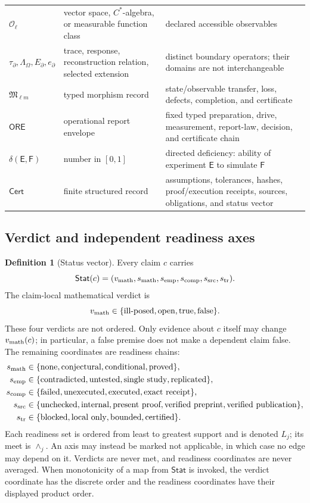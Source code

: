 \documentclass[11pt,a4paper]{article}
\theoremstyle{definition}
\newtheorem{definition}{Definition}[section]
\theoremstyle{plain}
\theoremstyle{remark}
\newcommand{\Obs}{\mathcal O}
\newcommand{\Cert}{\mathsf{Cert}}
\newcommand{\Stat}{\mathsf{Stat}}
\begin{document}
\begin{longtable}{L{0.18\textwidth}L{0.31\textwidth}L{0.42\textwidth}}
\(\Obs_\ell\) & vector space, \(C^*\)-algebra, or measurable function class &
declared accessible observables\\
\(\tau_\partial,\Lambda_\Omega,E_\partial,e_\partial\) & trace, response,
reconstruction relation, selected extension & distinct boundary operators;
their domains are not interchangeable\\
\(\mathfrak M_{\ell m}\) & typed morphism record & state/observable transfer,
loss, defects, completion, and certificate\\
\(\mathsf{ORE}\) & operational report envelope & fixed typed preparation,
drive, measurement, report-law, decision, and certificate chain\\
\(\delta(\mathsf E,\mathsf F)\) & number in \([0,1]\) & directed deficiency:
ability of experiment \(\mathsf E\) to simulate \(\mathsf F\)\\
\(\Cert\) & finite structured record & assumptions, tolerances, hashes,
proof/execution receipts, sources, obligations, and status vector\\
\bottomrule
\end{longtable}

\subsection{Verdict and independent readiness axes}

\begin{definition}[Status vector]\label{def:status}
Every claim \(c\) carries
\[
\Stat(c)=
(v_{\rm math},s_{\rm math},s_{\rm emp},s_{\rm comp},s_{\rm src},s_{\rm tr}).
\]
The claim-local mathematical verdict is
\[
v_{\rm math}\in\{\text{ill-posed},\text{open},\text{true},\text{false}\}.
\]
These four verdicts are not ordered.  Only evidence about \(c\) itself may
change \(v_{\rm math}(c)\); in particular, a false premise does not make a
dependent claim false.  The remaining coordinates are readiness chains:
\begin{align*}
s_{\rm math}&\in\{\text{none},\text{conjectural},\text{conditional},
   \text{proved}\},\\
s_{\rm emp}&\in\{\text{contradicted},\text{untested},\text{single study},
   \text{replicated}\},\\
s_{\rm comp}&\in\{\text{failed},\text{unexecuted},\text{executed},
\text{exact receipt}\},\\
s_{\rm src}&\in\{\text{unchecked},\text{internal},\text{present proof},
\text{verified preprint},\text{verified publication}\},\\
s_{\rm tr}&\in\{\text{blocked},\text{local only},\text{bounded},
   \text{certified}\}.
\end{align*}
Each readiness set is ordered from least to greatest support and is denoted
\(L_j\); its meet is \(\wedge_j\).  An axis may instead be marked not
applicable, in which case no edge may depend on it.  Verdicts are never met,
and readiness coordinates are never averaged.  When monotonicity of a map
from \(\Stat\) is invoked, the verdict coordinate has the discrete order and
the readiness coordinates have their displayed product order.
\end{definition}
\end{document}
